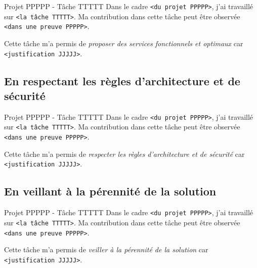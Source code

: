 \documentclass[%
    10pt,%
    usenames,%
    dvipsnames%
]{beamer}
\begin{document}
\begin{frame}[fragile]{Projet PPPPP - Tâche TTTTT}
\label{projet-ppppp---tuxe2che-ttttt-9}
Dans le cadre \texttt{\textless{}du\ projet\ PPPPP\textgreater{}}, j'ai
travaillé sur \texttt{\textless{}la\ tâche\ TTTTT\textgreater{}}. Ma
contribution dans cette tâche peut être observée
\texttt{\textless{}dans\ une\ preuve\ PPPPP\textgreater{}}.

Cette tâche m'a permis de \emph{proposer des services fonctionnels et
optimaux} car \texttt{\textless{}justification\ JJJJJ\textgreater{}}.
\end{frame}

\subsection{En respectant les règles d'architecture et de
sécurité}\label{en-respectant-les-ruxe8gles-darchitecture-et-de-suxe9curituxe9}

\begin{frame}[fragile]{Projet PPPPP - Tâche TTTTT}
\label{projet-ppppp---tuxe2che-ttttt-10}
Dans le cadre \texttt{\textless{}du\ projet\ PPPPP\textgreater{}}, j'ai
travaillé sur \texttt{\textless{}la\ tâche\ TTTTT\textgreater{}}. Ma
contribution dans cette tâche peut être observée
\texttt{\textless{}dans\ une\ preuve\ PPPPP\textgreater{}}.

Cette tâche m'a permis de \emph{respecter les règles d'architecture et
de sécurité} car \texttt{\textless{}justification\ JJJJJ\textgreater{}}.
\end{frame}

\subsection{En veillant à la pérennité de la
solution}\label{en-veillant-uxe0-la-puxe9rennituxe9-de-la-solution}

\begin{frame}[fragile]{Projet PPPPP - Tâche TTTTT}
\label{projet-ppppp---tuxe2che-ttttt-11}
Dans le cadre \texttt{\textless{}du\ projet\ PPPPP\textgreater{}}, j'ai
travaillé sur \texttt{\textless{}la\ tâche\ TTTTT\textgreater{}}. Ma
contribution dans cette tâche peut être observée
\texttt{\textless{}dans\ une\ preuve\ PPPPP\textgreater{}}.

Cette tâche m'a permis de \emph{veiller à la pérennité de la solution}
car \texttt{\textless{}justification\ JJJJJ\textgreater{}}.
\end{frame}
\end{document}
